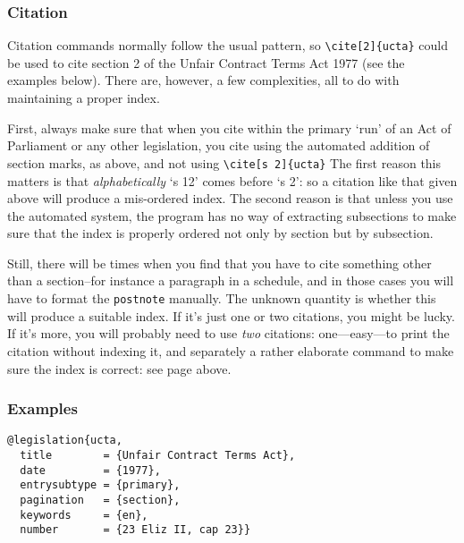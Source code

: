 \documentclass[a4paper,
               11pt,
	       DIV=1,			   
	       footinclude=false]
	      {scrartcl}
\newcounter{egcounter}\setcounter{egcounter}{0}
\newlength{\boxwidth}
\newenvironment{bibexample}[1][]
{%
  \medskip\par\noindent\ignorespaces
  \marginpar{[\refstepcounter{egcounter}\arabic{egcounter}]\label{#1}}%
  \setlength{\boxwidth}{0.95\linewidth}%
  \addtolength{\boxwidth}{-2\fboxsep}
  \addtolength{\boxwidth}{-2\fboxrule}
  \begin{lrbox}{\boxcontainer}
  \begin{minipage}[t]{\boxwidth}%
}
{%
  \end{minipage}\end{lrbox}%
  \colorbox{gray!30}{\usebox{\boxcontainer}}
  \par\medskip}
\begin{document}
\subsubsection{Citation}

Citation commands normally follow the usual pattern, so
\verb|\cite[2]{ucta}| could be used to cite section 2 of the Unfair
Contract Terms Act 1977 (see the examples below). There are, however,
a few complexities, all to do with maintaining a proper index.

First, always make sure that when you cite within the primary `run' of
an Act of Parliament or any other legislation, you cite using the automated addition of section
marks, as above, and not using \verb|\cite[s 2]{ucta}| The first reason
this matters is that \emph{alphabetically} `s 12' comes before `s
2': so a citation like that given above will produce a mis-ordered
index. The second reason is that unless you use the automated system,
the program has no way of extracting subsections to make sure that the
index is properly ordered not only by section but by subsection.

Still, there will be times when you find that you have to cite
something other than a section--for instance a paragraph in a
schedule, and in those cases you will have to format the
\texttt{postnote} manually. The unknown quantity is whether this will
produce a suitable index. If it's just one or two citations, you might
be lucky. If it's more, you will probably need to use \emph{two}
citations: one---easy---to print the citation without indexing it, and
separately a rather elaborate command to make sure the index is correct: see page \pageref{trickyindexing} above.

\subsubsection{Examples}

\begin{bibexample}[ucta]
\begin{verbatim}
@legislation{ucta,
  title        = {Unfair Contract Terms Act},
  date         = {1977},
  entrysubtype = {primary},
  pagination   = {section},
  keywords     = {en},
  number       = {23 Eliz II, cap 23}}
\end{verbatim}
\end{bibexample}
\end{document}
